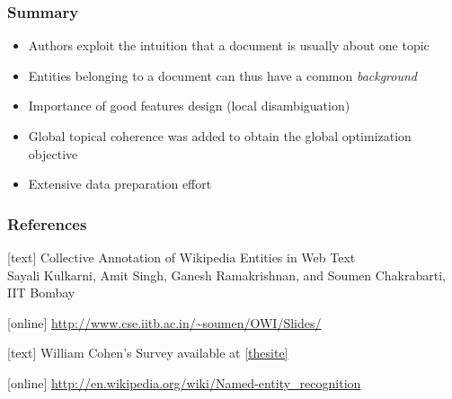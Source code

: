 \documentclass{beamer}
\begin{document}
 
 \begin{frame}
  \frametitle{Summary}
  \begin{itemize}
   \item Authors exploit the intuition that a document is usually about one topic \medskip 
   \item Entities belonging to a document can thus have a common \emph{background} \medskip
   \item Importance of good features design (local disambiguation) \medskip
   \item Global topical coherence was added to obtain the global optimization objective \medskip
   \item Extensive data preparation effort \medskip
   
  \end{itemize}

 \end{frame}

\begin{frame}
\frametitle{References}
\begin{thebibliography}{9}
[text]
 \label{thepaper} Collective Annotation of Wikipedia Entities in Web Text \\

Sayali Kulkarni, Amit Singh, Ganesh Ramakrishnan, and Soumen Chakrabarti,
 IIT Bombay

[online]
  \label{thesite} \url{http://www.cse.iitb.ac.in/~soumen/OWI/Slides/}

[text]
 \label{thesurvey} William Cohen's Survey available at \ref{thesite}

[online]
 \label{thewiki} \url{http://en.wikipedia.org/wiki/Named-entity_recognition}

\end{thebibliography}
\end{frame}
\end{document}
